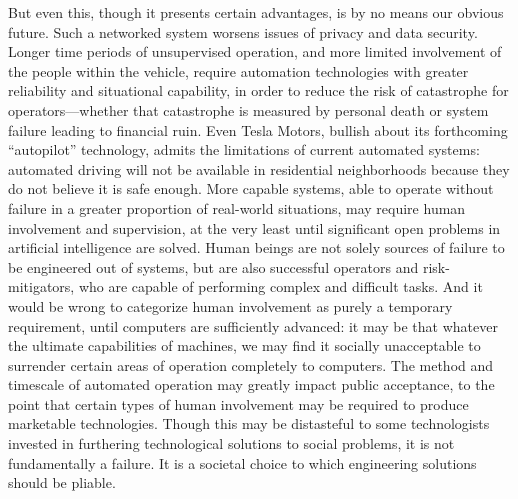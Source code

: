 But even this, though it presents certain advantages, is by no means
our obvious future. Such a networked system worsens issues of privacy
and data security. Longer time periods of unsupervised operation, and
more limited involvement of the people within the vehicle, require
automation technologies with greater reliability and situational
capability, in order to reduce the risk of catastrophe for
operators---whether that catastrophe is measured by personal death or
system failure leading to financial ruin. Even Tesla Motors, bullish
about its forthcoming ``autopilot'' technology, admits the limitations
of current automated systems: automated driving will not be available
in residential neighborhoods because they do not believe it is safe
enough\cite{???-http://www.slashgear.com/tesla-model-s-autopilot-update-due-in-3-4-months-19374458/}.
More capable systems, able to operate without failure in a greater
proportion of real-world situations, may require human involvement and
supervision, at the very least until significant open problems in
artificial intelligence are solved. Human beings are not solely
sources of failure to be engineered out of systems, but are also
successful operators and risk-mitigators, who are capable of
performing complex and difficult tasks. And it would be wrong to
categorize human involvement as purely a temporary requirement, until
computers are sufficiently advanced:  it
may be that whatever the ultimate capabilities of machines, we may
find it socially unacceptable to surrender certain areas of operation
completely to computers. The method and timescale of automated
operation may greatly impact 
public acceptance, to the point that certain types of human
involvement may be required to produce marketable technologies. Though
this may be distasteful to some technologists invested in furthering
technological solutions to social problems, it is not fundamentally
a failure. It is a societal choice to which engineering solutions
should be pliable.

